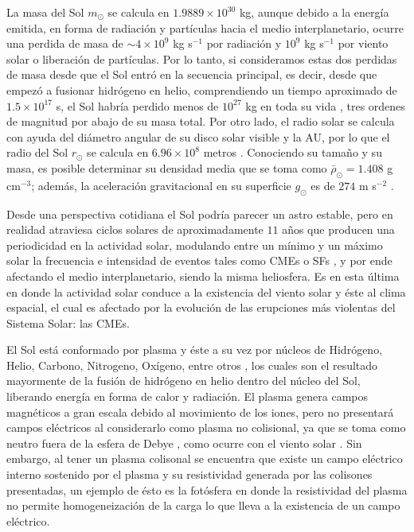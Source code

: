 La masa del Sol $m_{\odot}$ se calcula en $1.9889\times10^{30}$ kg, aunque debido a la energía emitida, en forma de radiación y partículas hacia el medio interplanetario, ocurre una perdida de masa de $\sim 4 \times 10^{9}$ kg s$^{-1}$ por radiación y $10^{9}$ kg s$^{-1}$ por viento solar o liberación de partículas. Por lo tanto, si consideramos estas dos perdidas de masa desde que el Sol entró en la secuencia principal, es decir, desde que empezó a fusionar hidrógeno en helio, comprendiendo un tiempo aproximado de $1.5\times10^{17}$ s, el Sol habría perdido menos de $10^{27}$ kg en toda su vida \parencite[e.g.,][]{stix-2002, pitjeva-2012}, tres ordenes de magnitud por abajo de su masa total. Por otro lado, el radio solar se calcula con ayuda del diámetro angular de su disco solar visible y la AU, por lo que el radio del Sol $r_\odot$ se calcula en $6.96\times10^{8}$ metros \parencite[e.g.,][]{rozelot-2018}. Conociendo su tamaño y su masa, es posible determinar su densidad media que se toma como $\bar{\rho}_{\odot}=1.408$ g cm$^{-3}$; además, la aceleración gravitacional en su superficie $g_{\odot}$ es de $274$ m s$^{-2}$ \parencite[e.g.,][]{stix-2002}.

Desde una perspectiva cotidiana el Sol podría parecer un astro estable, pero en realidad atraviesa ciclos solares de aproximadamente $11$ años que producen una periodicidad en la actividad solar, modulando entre un mínimo y un máximo solar la frecuencia e intensidad de eventos tales como \acsp{CME} o \acsp{SF} \parencite[e.g.,][]{gnevyshev-1977, hathaway-2015}, y por ende afectando el medio interplanetario, siendo la misma heliosfera. Es en esta última en donde la actividad solar conduce a la existencia del viento solar y éste al clima espacial, el cual es afectado por la evolución de las erupciones más violentas del Sistema Solar: las CMEs. 


El Sol está conformado por plasma y éste a su vez por núcleos de Hidrógeno, Helio, Carbono, Nitrogeno, Oxígeno, entre otros \parencite[e.g.,][]{asplund-2009, cermak-2025}, los cuales son el resultado mayormente de la fusión de hidrógeno en helio dentro del núcleo del Sol, liberando energía en forma de calor y radiación. El plasma genera campos magnéticos a gran escala debido al movimiento de los iones, pero no presentará campos eléctricos al considerarlo como plasma no colisional, ya que se toma como neutro fuera de la esfera de Debye \parencite[e.g.,][]{judge-2020}, como ocurre con el viento solar \parencite[e.g.,][]{artemyev-2018}. Sin embargo, al tener un plasma colisonal se encuentra que existe un campo eléctrico interno sostenido por el plasma y su resistividad generada por las colisones presentadas, un ejemplo de ésto es la fotósfera en donde la resistividad del plasma no permite homogeneización de la carga lo que lleva a la existencia de un campo eléctrico.

